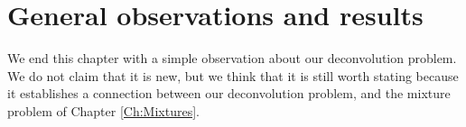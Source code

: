 








	

\section{General observations and results}
\label{sec:deconvolution observations and results}

We end this chapter with a simple observation about our deconvolution problem. We do not claim that it is new, but we think that it is still worth stating because it establishes a connection between our deconvolution problem, and the mixture problem of Chapter \ref{Ch:Mixtures}.

